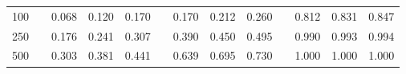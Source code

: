 % 
\begin{tabular}{ccccccccccccc}
  \hline
  \hline
100 &  & 0.068 & 0.120 & 0.170 &  & 0.170 & 0.212 & 0.260 &  & 0.812 & 0.831 & 0.847 \\ 
  250 &  & 0.176 & 0.241 & 0.307 &  & 0.390 & 0.450 & 0.495 &  & 0.990 & 0.993 & 0.994 \\ 
  500 &  & 0.303 & 0.381 & 0.441 &  & 0.639 & 0.695 & 0.730 &  & 1.000 & 1.000 & 1.000 \\ 
   \hline
\end{tabular}
